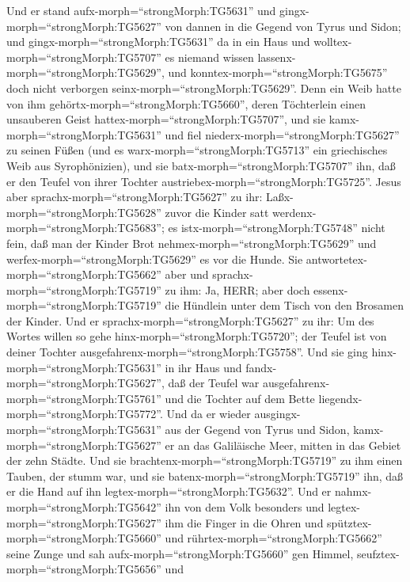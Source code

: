 Und er stand aufx-morph=``strongMorph:TG5631'' und
gingx-morph=``strongMorph:TG5627'' von dannen in die Gegend von Tyrus
und Sidon; und gingx-morph=``strongMorph:TG5631'' da in ein Haus und
wolltex-morph=``strongMorph:TG5707'' es niemand wissen
lassenx-morph=``strongMorph:TG5629'', und
konntex-morph=``strongMorph:TG5675'' doch nicht verborgen
seinx-morph=``strongMorph:TG5629''.  Denn ein Weib hatte
von ihm gehörtx-morph=``strongMorph:TG5660'', deren Töchterlein einen
unsauberen Geist hattex-morph=``strongMorph:TG5707'', und sie
kamx-morph=``strongMorph:TG5631'' und fiel
niederx-morph=``strongMorph:TG5627'' zu seinen Füßen  (und
es warx-morph=``strongMorph:TG5713'' ein griechisches Weib aus
Syrophönizien), und sie batx-morph=``strongMorph:TG5707'' ihn, daß er
den Teufel von ihrer Tochter austriebex-morph=``strongMorph:TG5725''.
 Jesus aber sprachx-morph=``strongMorph:TG5627'' zu ihr:
Laßx-morph=``strongMorph:TG5628'' zuvor die Kinder satt
werdenx-morph=``strongMorph:TG5683''; es
istx-morph=``strongMorph:TG5748'' nicht fein, daß man der Kinder Brot
nehmex-morph=``strongMorph:TG5629'' und
werfex-morph=``strongMorph:TG5629'' es vor die Hunde.  Sie
antwortetex-morph=``strongMorph:TG5662'' aber und
sprachx-morph=``strongMorph:TG5719'' zu ihm: Ja, HERR; aber doch
essenx-morph=``strongMorph:TG5719'' die Hündlein unter dem Tisch von den
Brosamen der Kinder.  Und er
sprachx-morph=``strongMorph:TG5627'' zu ihr: Um des Wortes willen so
gehe hinx-morph=``strongMorph:TG5720''; der Teufel ist von deiner
Tochter ausgefahrenx-morph=``strongMorph:TG5758''.  Und sie
ging hinx-morph=``strongMorph:TG5631'' in ihr Haus und
fandx-morph=``strongMorph:TG5627'', daß der Teufel war
ausgefahrenx-morph=``strongMorph:TG5761'' und die Tochter auf dem Bette
liegendx-morph=``strongMorph:TG5772''.  Und da er wieder
ausgingx-morph=``strongMorph:TG5631'' aus der Gegend von Tyrus und
Sidon, kamx-morph=``strongMorph:TG5627'' er an das Galiläische Meer,
mitten in das Gebiet der zehn Städte.  Und sie
brachtenx-morph=``strongMorph:TG5719'' zu ihm einen Tauben, der stumm
war, und sie batenx-morph=``strongMorph:TG5719'' ihn, daß er die Hand
auf ihn legtex-morph=``strongMorph:TG5632''.  Und er
nahmx-morph=``strongMorph:TG5642'' ihn von dem Volk besonders und
legtex-morph=``strongMorph:TG5627'' ihm die Finger in die Ohren und
spütztex-morph=``strongMorph:TG5660'' und
rührtex-morph=``strongMorph:TG5662'' seine Zunge  und sah
aufx-morph=``strongMorph:TG5660'' gen Himmel,
seufztex-morph=``strongMorph:TG5656'' und
